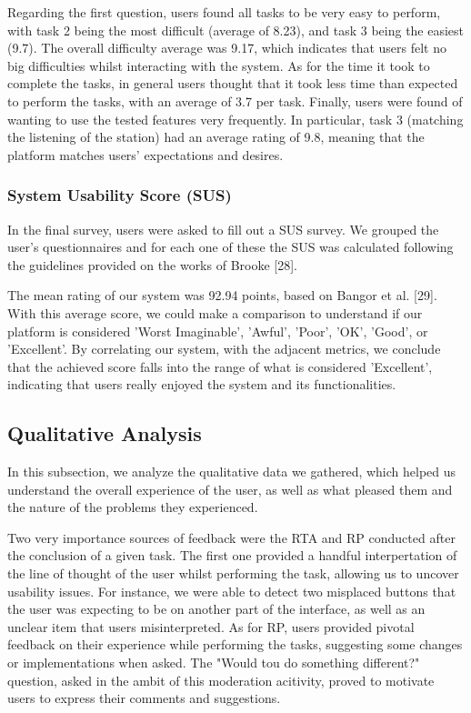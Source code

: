 {Regarding the first question, users found all tasks to be very easy to perform, with task 2 being the most difficult (average of 8.23), and task 3 being the easiest (9.7). The overall difficulty average was 9.17, which indicates that users felt no big difficulties whilst interacting with the system. As for the time it took to complete the tasks, in general users thought that it took less time than expected to perform the tasks, with an average of 3.7 per task. Finally, users were found of wanting to use the tested features very frequently. In particular, task 3 (matching the listening of the station) had an average rating of 9.8, meaning that the platform matches users' expectations and desires.

\subsubsection{System Usability Score (SUS)}

In the final survey, users were asked to fill out a \ac{SUS} survey. We grouped the user’s questionnaires and for each one of these the \ac{SUS} was calculated following the guidelines provided on the works of Brooke [28].

The mean rating of our system was 92.94 points, based on Bangor et al. [29]. With this average score, we could make a comparison to understand if our platform is considered 'Worst Imaginable', 'Awful', 'Poor', 'OK', 'Good', or 'Excellent'. By correlating our system, with the adjacent metrics, we conclude that the achieved score falls into the range of what is considered 'Excellent', indicating that users really enjoyed the system and its functionalities.


\subsection{Qualitative Analysis}

In this subsection, we analyze the qualitative data we gathered, which helped us understand the overall experience of the user, as well as what pleased them and the nature of the problems they experienced.

Two very importance sources of feedback were the \ac{RTA} and \ac{RP} conducted after the conclusion of a given task. The first one provided a handful interpertation of the line of thought of the user whilst performing the task, allowing us to uncover usability issues. For instance, we were able to detect two misplaced buttons that the user was expecting to be on another part of the interface, as well as an unclear item that users misinterpreted. As for \ac{RP}, users provided pivotal feedback on their experience while performing the tasks, suggesting some changes or implementations when asked. The "Would tou do something different?" question, asked in the ambit of this moderation acitivity, proved to motivate users to express their comments and suggestions.

}
